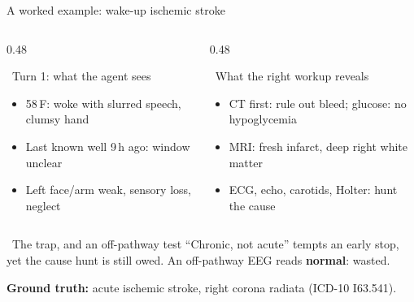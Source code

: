\documentclass[aspectratio=169,t]{beamer}
\begin{document}
\begin{frame}{A worked example: wake-up ischemic stroke}
  \begin{columns}[T,onlytextwidth]
    \begin{column}{0.48\textwidth}
      \begin{block}{\faUserInjured\;\, Turn 1: what the agent sees}
        \footnotesize
        \begin{itemize}\setlength\itemsep{0.15em}
          \item 58\,F: woke with slurred speech, clumsy hand
          \item Last known well 9\,h ago: window unclear
          \item Left face/arm weak, sensory loss, neglect
        \end{itemize}
      \end{block}
    \end{column}%
    \hfill
    \begin{column}{0.48\textwidth}
      \begin{alertblock}{\faVial\;\, What the right workup reveals}
        \footnotesize
        \begin{itemize}\setlength\itemsep{0.15em}
          \item CT first: rule out bleed; glucose: no hypoglycemia
          \item MRI: fresh infarct, deep right white matter
          \item ECG, echo, carotids, Holter: hunt the cause
        \end{itemize}
      \end{alertblock}
    \end{column}
  \end{columns}

  \vspace{1mm}
  \begin{exampleblock}{\faMinusCircle\;\, The trap, and an off-pathway test}
    \footnotesize
    \alert{``Chronic, not acute''} tempts an early stop, yet the cause hunt is still owed. An off-pathway EEG reads \textbf{normal}: wasted.
  \end{exampleblock}

  \vspace{0.5mm}
  \centering\footnotesize\color{CERNnavy}
  {\faNotesMedical}\;\textbf{Ground truth:} acute ischemic stroke, right corona radiata (ICD-10 I63.541).
\end{frame}
\end{document}
